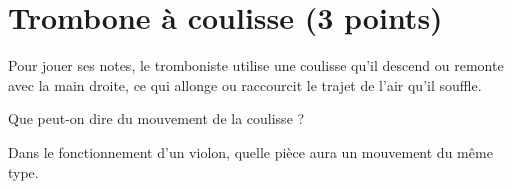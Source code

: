 \section{Trombone à coulisse (3 points)}

Pour jouer ses notes, le tromboniste utilise une coulisse qu'il descend ou remonte avec la main droite, ce qui allonge ou raccourcit le trajet de l'air qu'il souffle.

\begin{questions}
	\question[1] Que peut-on dire du mouvement de la coulisse ?
	
	\fillwithdottedlines{3.5cm}
	
	\question[2] Dans le fonctionnement d'un violon, quelle pièce aura un mouvement du même type.
	\fillwithdottedlines{3.5cm}
\end{questions}